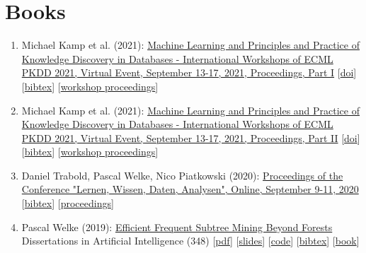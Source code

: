 \documentclass{scrartcl}
\begin{document}
\section{Books}
\begin{enumerate}
\conti
\item
\label{ecml2021workshop1}
Michael Kamp et al. (2021):\newline
\href{https://dx.doi.org/10.1007/978-3-030-93736-2}{Machine Learning and Principles and Practice of Knowledge Discovery
in Databases - International Workshops of ECML PKDD 2021, Virtual
Event, September 13-17, 2021, Proceedings, Part I}\newline
{\footnotesize
[\href{https://dx.doi.org/10.1007/978-3-030-93736-2}{doi}]
[\href{https://dblp.org/rec/conf/pkdd/2021-w1.bib}{bibtex}]
[\href{https://pwelke.de/}{workshop proceedings}]
}
\item
\label{ecml2021workshop2}
Michael Kamp et al. (2021):\newline
\href{https://dx.doi.org/10.1007/978-3-030-93733-1}{Machine Learning and Principles and Practice of Knowledge Discovery
in Databases - International Workshops of ECML PKDD 2021, Virtual
Event, September 13-17, 2021, Proceedings, Part II}\newline
{\footnotesize
[\href{https://dx.doi.org/10.1007/978-3-030-93733-1}{doi}]
[\href{https://dblp.org/rec/conf/pkdd/2021-w2.bib}{bibtex}]
[\href{https://pwelke.de/}{workshop proceedings}]
}
\item
\label{lwda2020proceedings}
Daniel Trabold, Pascal Welke, Nico Piatkowski (2020):\newline
\href{https://ceur-ws.org/Vol-2738}{Proceedings of the Conference "Lernen, Wissen, Daten, Analysen", Online,
September 9-11, 2020}\newline
{\footnotesize
[\href{https://dblp.org/rec/conf/lwa/2020.bib}{bibtex}]
[\href{https://ceur-ws.org/Vol-2738}{proceedings}]
}
\item
\label{welke2019diss}
Pascal Welke (2019):\newline
\href{https://hdl.handle.net/20.500.11811/7893}{Efficient Frequent Subtree Mining Beyond Forests}\newline
Dissertations in Artificial Intelligence (348)\newline
{\footnotesize
[\href{https://bonndoc.ulb.uni-bonn.de/xmlui/bitstream/handle/20.500.11811/7893/5401.pdf}{pdf}]
[\href{https://pwelke.de/publications/welke2019diss-slides.pdf}{slides}]
[\href{https://github.com/pwelke/GraphMiningTools}{code}]
[\href{https://dblp.org/rec/phd/dnb/Welke19.bib}{bibtex}]
[\href{https://www.iospress.nl/book/efficient-frequent-subtree-mining-beyond-forests/}{book}]
}
\seti
\end{enumerate}
\end{document}
